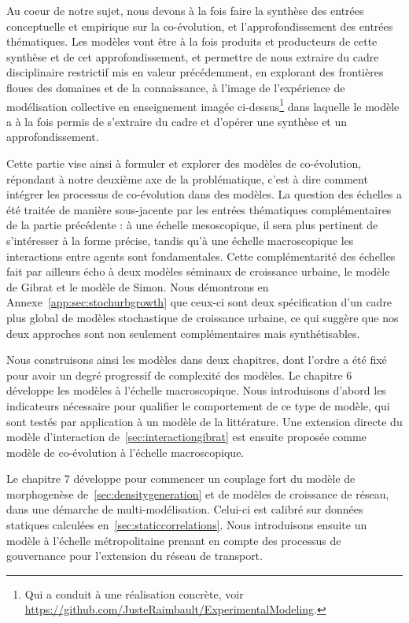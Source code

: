 Au coeur de notre sujet, nous devons à la fois faire la synthèse des entrées conceptuelle et empirique sur la co-évolution, et l'approfondissement des entrées thématiques. Les modèles vont être à la fois produits et producteurs de cette synthèse et de cet approfondissement, et permettre de nous extraire du cadre disciplinaire restrictif mis en valeur précédemment, en explorant des frontières floues des domaines et de la connaissance, à l'image de l'expérience de modélisation collective en enseignement imagée ci-dessus\footnote{Qui a conduit à une réalisation concrète, voir \url{https://github.com/JusteRaimbault/ExperimentalModeling}.} dans laquelle le modèle a à la fois permis de s'extraire du cadre et d'opérer une synthèse et un approfondissement.


Cette partie vise ainsi à formuler et explorer des modèles de co-évolution, répondant à notre deuxième axe de la problématique, c'est à dire comment intégrer les processus de co-évolution dans des modèles. La question des échelles a été traitée de manière sous-jacente par les entrées thématiques complémentaires de la partie précédente : à une échelle mesoscopique, il sera plus pertinent de s'intéresser à la forme précise, tandis qu'à une échelle macroscopique les interactions entre agents sont fondamentales. Cette complémentarité des échelles fait par ailleurs écho à deux modèles séminaux de croissance urbaine, le modèle de Gibrat et le modèle de Simon. Nous démontrons en Annexe~\ref{app:sec:stochurbgrowth} que ceux-ci sont deux spécification d'un cadre plus global de modèles stochastique de croissance urbaine, ce qui suggère que nos deux approches sont non seulement complémentaires mais synthétisables.


Nous construisons ainsi les modèles dans deux chapitres, dont l'ordre a été fixé pour avoir un degré progressif de complexité des modèles. Le chapitre 6 développe les modèles à l'échelle macroscopique. Nous introduisons d'abord les indicateurs nécessaire pour qualifier le comportement de ce type de modèle, qui sont testés par application à un modèle de la littérature. Une extension directe du modèle d'interaction de~\ref{sec:interactiongibrat} est ensuite proposée comme modèle de co-évolution à l'échelle macroscopique.

Le chapitre 7 développe pour commencer un couplage fort du modèle de morphogenèse de~\ref{sec:densitygeneration} et de modèles de croissance de réseau, dans une démarche de multi-modélisation. Celui-ci est calibré sur données statiques calculées en~\ref{sec:staticcorrelations}. Nous introduisons ensuite un modèle à l'échelle métropolitaine prenant en compte des processus de gouvernance pour l'extension du réseau de transport.



